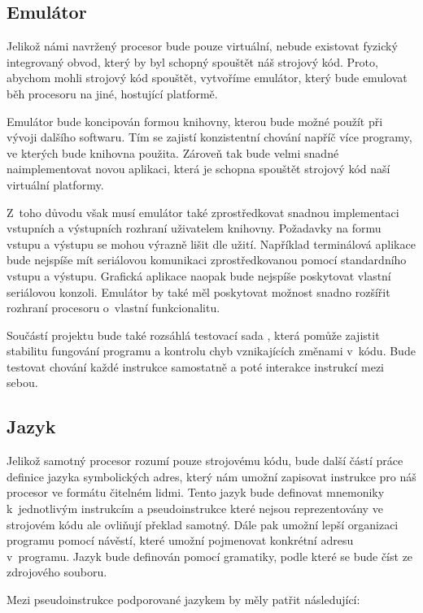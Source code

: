 \subsection{Emulátor}
\label{sec:asm-spec}

Jelikož námi navržený procesor bude pouze virtuální, nebude existovat fyzický integrovaný obvod, který by byl schopný spouštět náš strojový kód. Proto, abychom mohli strojový kód spouštět, vytvoříme emulátor, který bude emulovat běh procesoru na jiné, hostující platformě.

Emulátor bude koncipován formou knihovny, kterou bude možné použít při vývoji dalšího softwaru. Tím se zajistí konzistentní chování napříč více programy, ve kterých bude knihovna použita. Zároveň tak bude velmi snadné naimplementovat novou aplikaci, která je schopna spouštět strojový kód naší virtuální platformy.

Z~toho důvodu však musí emulátor také zprostředkovat snadnou implementaci vstupních a výstupních rozhraní uživatelem knihovny. Požadavky na formu vstupu a výstupu se mohou výrazně lišit dle užití. Například terminálová aplikace bude nejspíše mít seriálovou komunikaci zprostředkovanou pomocí standardního vstupu a výstupu. Grafická aplikace naopak bude nej\-spí\-še poskytovat vlastní seriálovou konzoli. Emulátor by také měl poskytovat mož\-nost snadno rozšířit rozhraní procesoru o~vlastní funkcionalitu.

Součástí projektu bude také rozsáhlá testovací sada , která pomůže zajistit stabilitu fungování programu a kontrolu chyb vznikajících změnami v~kódu. Bude testovat chování každé instrukce samostatně a poté interakce instrukcí mezi sebou.

\subsection{Jazyk}

Jelikož samotný procesor rozumí pouze strojovému kódu, bude další částí práce definice jazyka symbolických adres, který nám umožní zapisovat instrukce pro náš procesor ve formátu čitelném lidmi. Tento jazyk bude definovat mnemoniky k~jednotlivým instrukcím a pseudoinstrukce které nejsou reprezentovány ve strojovém kódu ale ovliňují překlad samotný. Dále pak umožní lepší organizaci programu pomocí návěstí, které umožní pojmenovat konkrétní adresu v~programu. Jazyk bude definován pomocí gramatiky, podle které se bude číst ze zdrojového souboru.

Mezi pseudoinstrukce podporované jazykem by měly patřit následující:

